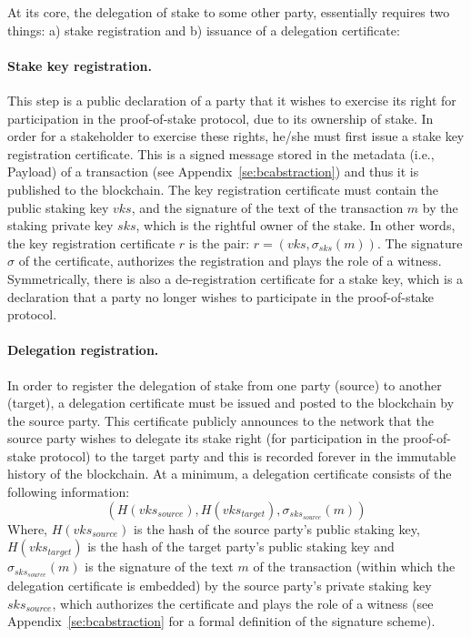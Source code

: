 At its core, the delegation of stake to some other party, essentially requires two things: a) stake registration and b) issuance of a delegation certificate:

\paragraph{Stake key registration.}
This step is a public declaration of a party that it wishes to exercise its right for participation in the proof-of-stake protocol, due to its ownership of stake. In order for a stakeholder to exercise these rights, he/she must first issue a stake key registration certificate. This is a signed message stored in the metadata (i.e., Payload) of a transaction (see Appendix~\ref{se:bcabstraction}) and thus it is published to the blockchain. The key registration certificate must contain the public staking key $vks$, and the signature of the text of the transaction $m$ by the staking private key $sks$, which is the rightful owner of the stake. In other words, the key registration certificate $r$ is the pair: $r = (vks, \sigma_{sks}(m))$. The signature $\sigma$ of the certificate, authorizes the registration and  plays the role of a witness.
Symmetrically, there is also a de-registration certificate for a stake key, which is a declaration that a party no longer wishes to participate in the proof-of-stake protocol.

\paragraph{Delegation registration.}
In order to register the delegation of stake from one party (source) to another (target), a delegation certificate must be issued and posted to the blockchain by the source party. This certificate publicly announces to the network that the source party wishes to delegate its stake right (for participation in the proof-of-stake protocol) to the target party and this is recorded forever in the immutable history of the blockchain.
At a minimum, a delegation certificate consists of the following information:
$$
(H(vks_{source}), H(vks_{target}), \sigma_{sks_{source}}(m))
$$
Where, $H(vks_{source})$ is the hash of the source party's public staking key, $H(vks_{target})$ is the hash of the target party's public staking key and $\sigma_{sks_{source}}(m)$ is the signature of the text $m$ of the transaction (within which the delegation certificate is embedded) by the source party's private staking key $sks_{source}$, which authorizes the certificate and plays the role of a witness (see Appendix~\ref{se:bcabstraction} for a formal definition of the signature scheme).

